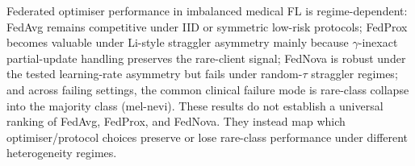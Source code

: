 \documentclass[11pt,a4paper]{report}
\begin{document}
Federated optimiser performance in imbalanced medical FL is regime-dependent:
FedAvg remains competitive under IID or symmetric low-risk protocols;
FedProx becomes valuable under Li-style straggler asymmetry mainly because
$\gamma$-inexact partial-update handling preserves the rare-client signal;
FedNova is robust under the tested learning-rate asymmetry but fails under
random-$\tau$ straggler regimes; and across failing settings, the common
clinical failure mode is rare-class collapse into the majority class
(mel-nevi). These results do not establish a universal ranking of FedAvg,
FedProx, and FedNova. They instead map which optimiser/protocol choices
preserve or lose rare-class performance under different heterogeneity
regimes.


\end{document}
